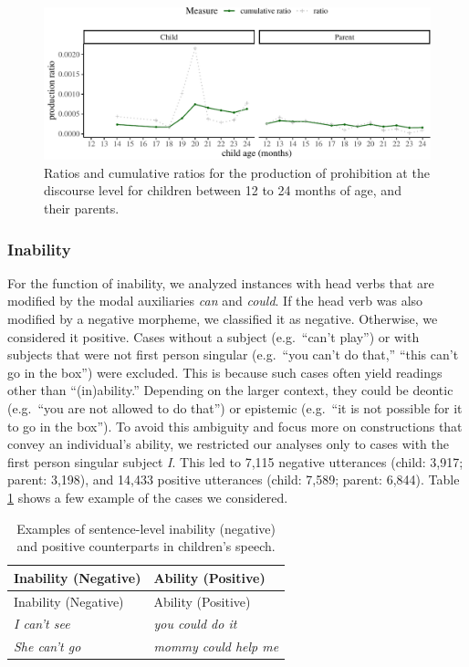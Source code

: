 \documentclass[
  english,
  man,floatsintext]{apa6}
\begin{document}
\begin{figure}[H]

{\centering \includegraphics{neg_construction_article_files/figure-latex/prohibitiondiscoursebegin-1} 

}

\caption{Ratios and cumulative ratios for the production of prohibition at the discourse level for children between 12 to 24 months of age, and their parents.}\label{fig:prohibitiondiscoursebegin}
\end{figure}

\hypertarget{inability}{%
\subsubsection{Inability}\label{inability}}

For the function of inability, we analyzed instances with head verbs that are modified by the modal auxiliaries \emph{can} and \emph{could}. If the head verb was also modified by a negative morpheme, we classified it as negative. Otherwise, we considered it positive. Cases without a subject (e.g.~``can't play'') or with subjects that were not first person singular (e.g.~``you can't do that,'' ``this can't go in the box'') were excluded. This is because such cases often yield readings other than ``(in)ability.'' Depending on the larger context, they could be deontic (e.g.~``you are not allowed to do that'') or epistemic (e.g.~``it is not possible for it to go in the box''). To avoid this ambiguity and focus more on constructions that convey an individual's ability, we restricted our analyses only to cases with the first person singular subject \emph{I}. This led to 7,115 negative utterances (child: 3,917; parent: 3,198), and 14,433 positive utterances (child: 7,589; parent: 6,844). Table \ref{tab:inab} shows a few example of the cases we considered.

\begin{longtable}[]{@{}ll@{}}
\caption{\label{tab:inab} Examples of sentence-level inability (negative) and positive counterparts in children's speech.}\tabularnewline
\toprule
Inability (Negative) & Ability (Positive) \\
\midrule
\endfirsthead
\toprule
Inability (Negative) & Ability (Positive) \\
\midrule
\endhead
\emph{I can't see} & \emph{you could do it} \\
\emph{She can't go} & \emph{mommy could help me} \\
\bottomrule
\end{longtable}
\end{document}
